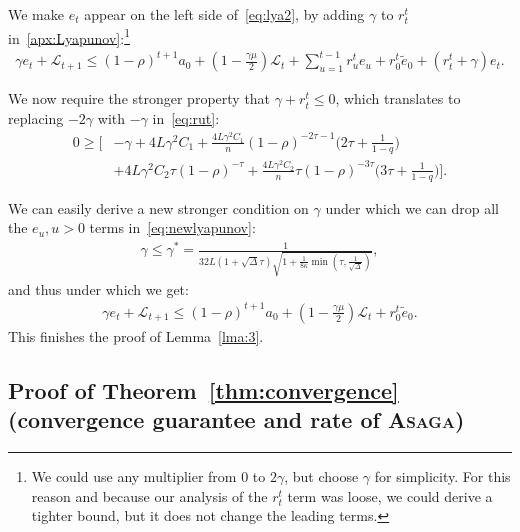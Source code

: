 \documentclass[twoside, 11pt]{article}
\newcommand{\stepsize}{\gamma}
\newcommand{\strongconvex}{\mu}
\newcommand{\overlap}{\tau}
\newcommand{\contraction}{\rho}
\newcommand{\sparsity}{\Delta}
\newcommand{\lipschitz}{L}
\newcommand{\lyapunov}{\mathcal{L}}
\newcommand{\ASAGA}{\textsc{Asaga}}
\begin{document}
We make $e_t$ appear on the left side of~\eqref{eq:lya2}, by adding $\stepsize$ to $r_t^t$ in~\eqref{apx:Lyapunov}:\footnote{We could use any multiplier from $0$ to $2\stepsize$, but choose $\stepsize$ for simplicity. For this reason and because our analysis of the $r_t^t$ term was loose, we could derive a tighter bound, but it does not change the leading terms.}
\begin{align}\label{eq:newlyapunov}
\stepsize e_t + \lyapunov_{t+1} \leq (1 - \contraction)^{t+1}a_0 + (1-\frac{\stepsize\strongconvex}{2})\lyapunov_t + \sum_{u=1}^{t-1} r_u^t e_u + r_0^t \tilde e_0 + (r_t^t + \stepsize)e_t .
\end{align}

We now require the stronger property that $\stepsize +r_t^t \leq 0$, which translates to replacing $-2\stepsize$ with $-\stepsize$ in~\eqref{eq:rut}:
\begin{equation}
\begin{aligned}
0 \geq
	\Big[
		&- \stepsize
		+4\lipschitz\stepsize^2 C_1
		+\frac{4\lipschitz\stepsize^2 C_1}{n}
			(1 - \contraction)^{-2\overlap -1} \big(
				2\overlap
				+ \frac{1}{1-q}
			\big)
\\
		&+4\lipschitz\stepsize^2  C_2 \overlap (1 - \contraction)^{-\overlap}
		+\frac{4\lipschitz\stepsize^2  C_2}{n} \overlap (1 -\contraction)^{-3\overlap}
			\big(
				3\overlap
				+ \frac{1}{1-q}
		\big)
	\Big] .
\end{aligned}
\end{equation}

We can easily derive a new stronger condition on $\stepsize$ under which we can drop all the $e_u, u > 0$ terms in~\eqref{eq:newlyapunov}:
\begin{align}
\stepsize \leq \stepsize^* = \frac{1}{32\lipschitz (1 + \sqrt{\sparsity} \overlap) \sqrt{1 + \frac{1}{8\kappa} \min(\overlap, \frac{1}{\sqrt{\sparsity}})}},
\end{align}
and thus under which we get:
\begin{align}\label{eq:lyapu3}
\stepsize  e_t + \lyapunov_{t+1} \leq (1 - \contraction)^{t+1}a_0 + (1-\frac{\stepsize\strongconvex}{2})\lyapunov_t + r_0^t \tilde e_0 .
\end{align}
This finishes the proof of Lemma~\ref{lma:3}.
\hfill\BlackBox

\subsection{Proof of Theorem~\ref{thm:convergence} (convergence guarantee and rate of \ASAGA)}\label{apxB:th2}
\end{document}
